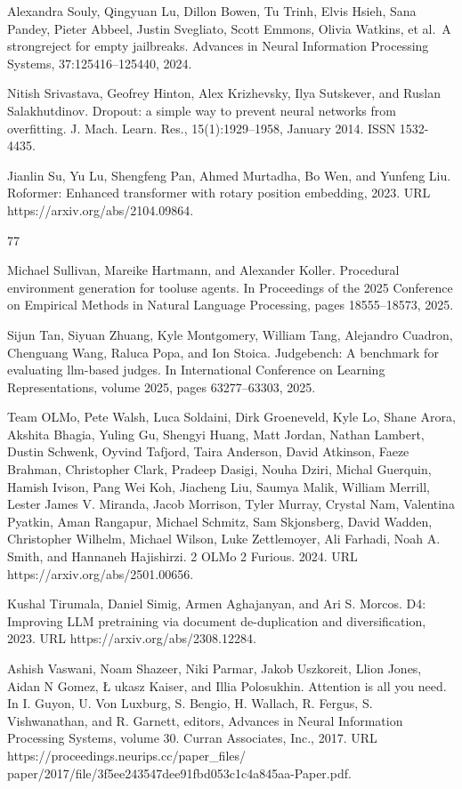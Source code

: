 \documentclass[
  10
]{article}
\begin{document}
Alexandra Souly, Qingyuan Lu, Dillon Bowen, Tu Trinh, Elvis Hsieh, Sana
Pandey, Pieter Abbeel, Justin Svegliato, Scott Emmons, Olivia Watkins,
et al.~A strongreject for empty jailbreaks. Advances in Neural
Information Processing Systems, 37:125416--125440, 2024.

Nitish Srivastava, Geofrey Hinton, Alex Krizhevsky, Ilya Sutskever, and
Ruslan Salakhutdinov. Dropout: a simple way to prevent neural networks
from overfitting. J. Mach. Learn. Res., 15(1):1929--1958, January 2014.
ISSN 1532-4435.

Jianlin Su, Yu Lu, Shengfeng Pan, Ahmed Murtadha, Bo Wen, and Yunfeng
Liu. Roformer: Enhanced transformer with rotary position embedding,
2023. URL https://arxiv.org/abs/2104.09864.

77

Michael Sullivan, Mareike Hartmann, and Alexander Koller. Procedural
environment generation for tooluse agents. In Proceedings of the 2025
Conference on Empirical Methods in Natural Language Processing, pages
18555--18573, 2025.

Sijun Tan, Siyuan Zhuang, Kyle Montgomery, William Tang, Alejandro
Cuadron, Chenguang Wang, Raluca Popa, and Ion Stoica. Judgebench: A
benchmark for evaluating llm-based judges. In International Conference
on Learning Representations, volume 2025, pages 63277--63303, 2025.

Team OLMo, Pete Walsh, Luca Soldaini, Dirk Groeneveld, Kyle Lo, Shane
Arora, Akshita Bhagia, Yuling Gu, Shengyi Huang, Matt Jordan, Nathan
Lambert, Dustin Schwenk, Oyvind Tafjord, Taira Anderson, David Atkinson,
Faeze Brahman, Christopher Clark, Pradeep Dasigi, Nouha Dziri, Michal
Guerquin, Hamish Ivison, Pang Wei Koh, Jiacheng Liu, Saumya Malik,
William Merrill, Lester James V. Miranda, Jacob Morrison, Tyler Murray,
Crystal Nam, Valentina Pyatkin, Aman Rangapur, Michael Schmitz, Sam
Skjonsberg, David Wadden, Christopher Wilhelm, Michael Wilson, Luke
Zettlemoyer, Ali Farhadi, Noah A. Smith, and Hannaneh Hajishirzi. 2 OLMo
2 Furious. 2024. URL https://arxiv.org/abs/2501.00656.

Kushal Tirumala, Daniel Simig, Armen Aghajanyan, and Ari S. Morcos. D4:
Improving LLM pretraining via document de-duplication and
diversification, 2023. URL https://arxiv.org/abs/2308.12284.

Ashish Vaswani, Noam Shazeer, Niki Parmar, Jakob Uszkoreit, Llion Jones,
Aidan N Gomez, Ł ukasz Kaiser, and Illia Polosukhin. Attention is all
you need. In I. Guyon, U. Von Luxburg, S. Bengio, H. Wallach, R. Fergus,
S. Vishwanathan, and R. Garnett, editors, Advances in Neural Information
Processing Systems, volume 30. Curran Associates, Inc., 2017. URL
https://proceedings.neurips.cc/paper\_files/
paper/2017/file/3f5ee243547dee91fbd053c1c4a845aa-Paper.pdf.
\end{document}
